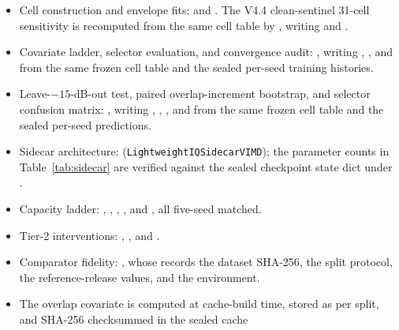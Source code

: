 \documentclass[letterpaper,onecolumn,11pt,journal]{IEEEtran}
\begin{document}
\begin{itemize}\setlength{\itemsep}{2pt}
  \item Cell construction and envelope fits:
   and
  .  The V4.4 clean-sentinel
  31-cell sensitivity is recomputed from the same cell table by
  , writing
   and
  .
  \item Covariate ladder, selector evaluation, and convergence audit:
  , writing
  , , and
   from the same frozen cell table and the
  sealed per-seed  training histories.
  \item Leave-$-15$-dB-out test, paired overlap-increment bootstrap, and
  selector confusion matrix:
  , writing
  , ,
  , and 
  from the same frozen cell table and the sealed per-seed predictions.
  \item Sidecar architecture:
  (\texttt{LightweightIQSidecarVIMD}); the parameter counts in
  Table~\ref{tab:sidecar} are verified against the sealed checkpoint state
  dict under .
  \item Capacity ladder: ,
  ,
  ,
  , and
  , all five-seed matched.
  \item Tier-2 interventions: ,
  , and
  .
  \item Comparator fidelity: , whose
   records the dataset SHA-256, the split protocol, the
  reference-release values, and the environment.
  \item The overlap covariate is computed at cache-build time, stored as
   per split, and SHA-256 checksummed in the sealed cache

\end{itemize}
\end{document}
